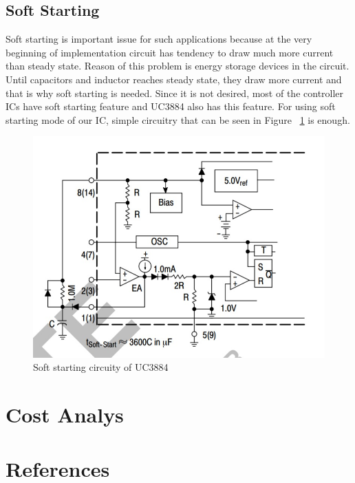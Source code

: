 \documentclass{article}
\begin{document}
\subsection{Soft Starting}
Soft starting is important issue for such applications because at the very beginning of implementation circuit has tendency to draw much more current than steady state. Reason of this problem is energy storage devices in the circuit. Until capacitors and inductor reaches steady state, they draw more current and that is why soft starting is needed. Since it is not desired, most of the controller ICs have soft starting feature and UC3884 also has this feature. For using soft starting mode of our IC, simple circuitry that can be seen in Figure ~\ref{fig:soft} is enough.
\begin{figure}[H]
    \centering
    \includegraphics[width=0.5\linewidth]{ic.jpeg}
    \caption {Soft starting circuity of UC3884}
    \label{fig:soft}
\end{figure}
\section{Cost Analys}

\section{References}
\printbibliography
\end{document}
